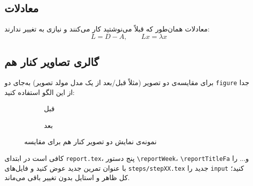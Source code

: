 \subsection{معادلات}
معادلات همان‌طور که قبلاً می‌نوشتید کار می‌کنند و نیازی به تغییر ندارند:
\[
L = D - A, \qquad Lx = \lambda x
\]

\subsection{گالری تصاویر کنار هم}
برای مقایسه‌ی دو تصویر (مثلاً قبل/بعد از یک مدل مولد تصویر) به‌جای دو \texttt{figure} جدا از این الگو استفاده کنید:

\begin{figure}[h!]
\centering
\begin{subfigure}{0.46\textwidth}
    \centering
    \fbox{\rule{0pt}{3cm}\rule{3cm}{0pt}} %
    \caption{قبل}
\end{subfigure}
\hfill
\begin{subfigure}{0.46\textwidth}
    \centering
    \fbox{\rule{0pt}{3cm}\rule{3cm}{0pt}} %
    \caption{بعد}
\end{subfigure}
\caption{نمونه‌ی نمایش دو تصویر کنار هم برای مقایسه}
\label{fig:before_after_demo}
\end{figure}

\begin{notebox}
کافی است در ابتدای \texttt{report.tex}، پنج دستور \texttt{\textbackslash reportWeek}، \texttt{\textbackslash reportTitleFa} و... را با عنوان تمرین جدید عوض کنید و فایل‌های \texttt{steps/stepXX.tex} جدید را \texttt{input} کنید؛ کل ظاهر و استایل بدون تغییر باقی می‌ماند.
\end{notebox}
